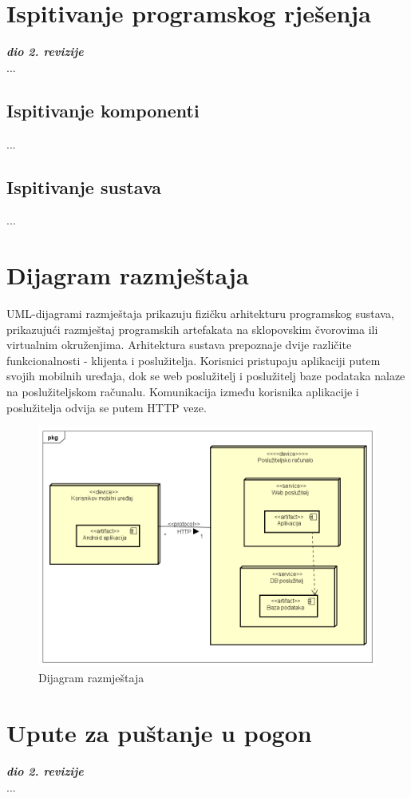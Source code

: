 			\eject 
		
	
		\section{Ispitivanje programskog rješenja}
			
			\textbf{\textit{dio 2. revizije}}\\
			
			 ...
	
			
			\subsection{Ispitivanje komponenti}
			...
			
			
			
			\subsection{Ispitivanje sustava}
			
			...
			 
			
			\eject 
		
		
		\section{Dijagram razmještaja}
			
			UML-dijagrami razmještaja prikazuju fizičku arhitekturu programskog sustava, prikazujući razmještaj programskih artefakata na sklopovskim čvorovima ili virtualnim okruženjima. Arhitektura sustava prepoznaje dvije različite funkcionalnosti - klijenta i poslužitelja. Korisnici pristupaju aplikaciji putem svojih mobilnih uređaja, dok se web poslužitelj i poslužitelj baze podataka nalaze na poslužiteljskom računalu. Komunikacija između korisnika aplikacije i poslužitelja odvija se putem HTTP veze.
			
			 \begin{figure}[H]
			 	\includegraphics[scale=0.6]{dijagrami/dijagramRazmjestaja/dijagramRazmjestaja.PNG} %
			 	\centering
			 	\caption{Dijagram razmještaja}
			 	\label{fig:dRazmjestaja}
			 \end{figure}
			
			\eject 
		
		\section{Upute za puštanje u pogon}
		
			\textbf{\textit{dio 2. revizije}}\\
		
			...
			
			
			\eject 